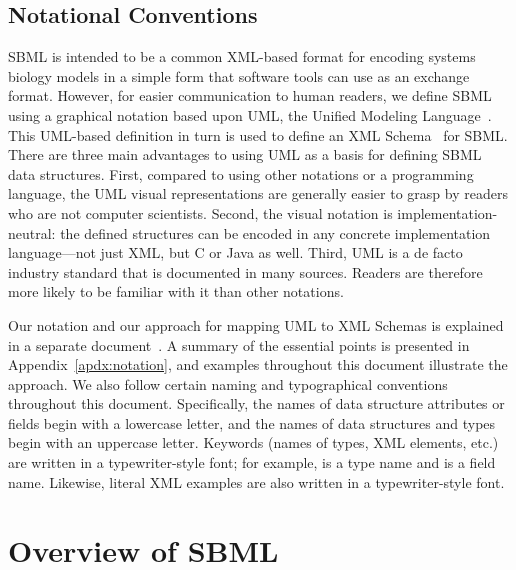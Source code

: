 \documentclass[10pt,twocolumntoc]{cekarticle}
\begin{document}
\subsection{Notational Conventions}

SBML is intended to be a common XML-based format for encoding systems
biology models in a simple form that software tools can use as an exchange
format.  However, for easier communication to human readers, we define SBML
using a graphical notation based upon UML, the Unified Modeling
Language~\citep{eriksson:1998,oestereich:1999}.  This UML-based definition
in turn is used to define an XML
Schema~\citep{biron:2000,fallside:2000,thompson:2000} for SBML.  There are
three main advantages to using UML as a basis for defining SBML data
structures.  First, compared to using other notations or a programming
language, the UML visual representations are generally easier to grasp by
readers who are not computer scientists.  Second, the visual notation is
implementation-neutral: the defined structures can be encoded in any
concrete implementation language---not just XML, but C or Java as well.
Third, UML is a de facto industry standard that is documented in many
sources.  Readers are therefore more likely to be familiar with it than
other notations.

Our notation and our approach for mapping UML to XML Schemas is explained
in a separate document~\citep{hucka:2000b}.  A summary of the essential
points is presented in Appendix~\ref{apdx:notation}, and examples
throughout this document illustrate the approach.  We also follow certain
naming and typographical conventions throughout this document.
Specifically, the names of data structure attributes or fields begin with a
lowercase letter, and the names of data structures and types begin with an
uppercase letter.  Keywords (names of types, XML elements, etc.) are
written in a typewriter-style font; for example,  is a
type name and  is a field name.  Likewise, literal XML
examples are also written in a typewriter-style font.


\section{Overview of SBML}
\label{sec:overview}
\end{document}
